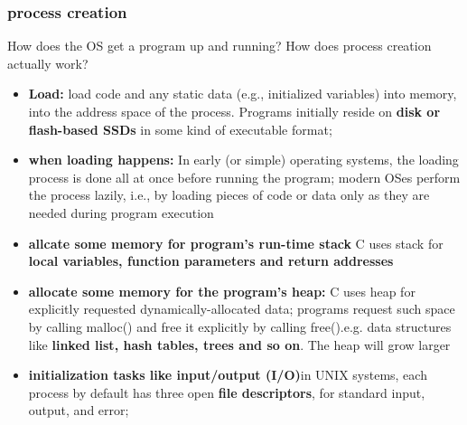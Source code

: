 \documentclass{article}
\begin{document}
\subsubsection{process creation}
How does the OS get a program up
and running? How does process creation actually work?
\begin{itemize}
    \item \textbf{Load:} load code and any static data (e.g., initialized variables) into memory, into the address space of the process. Programs initially reside on \textbf{disk or flash-based SSDs} in some kind of executable format;
    
    \item \textbf{when loading happens: }In early (or simple) operating systems, the loading process is done all at once before running the program; modern OSes perform the process lazily, i.e., by loading pieces of code or data only as they are needed during program execution
    
    \item \textbf{allcate some memory for program's run-time stack} C uses stack for \textbf{local variables, function parameters and return addresses}
    
    \item \textbf{allocate some memory for the program’s heap: } C uses heap for explicitly requested dynamically-allocated data; programs request such space by calling malloc() and free it explicitly by calling free().e.g. data structures like \textbf{linked list, hash tables, trees and so on}. The heap will grow larger
    
    \item \textbf{initialization tasks like input/output (I/O)}in UNIX systems, each process by default has three open \textbf{file descriptors}, for standard input, output, and error;
\end{itemize}
\end{document}
